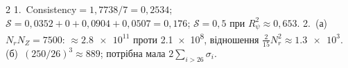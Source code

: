 {\begin{multicols}{2}
1.~Consistency${}=1{,}7738/7=0{,}2534$; $\mathcal S=0{,}0352+0+0{,}0904+0{,}0507=0{,}176$; $\mathcal S=0{,}5$ при $R^2_\psi\approx0{,}653$.
2.~(а)~$N_rN_Z=7500$: $\approx\num{2,8e11}$ проти \num{2,1e8}, відношення $\tfrac{2}{15}N_r^2\approx\num{1,3e3}$. (б)~$(250/26)^3\approx889$; потрібна мала $2\sum_{i>26}\sigma_i$.
\end{multicols}}
